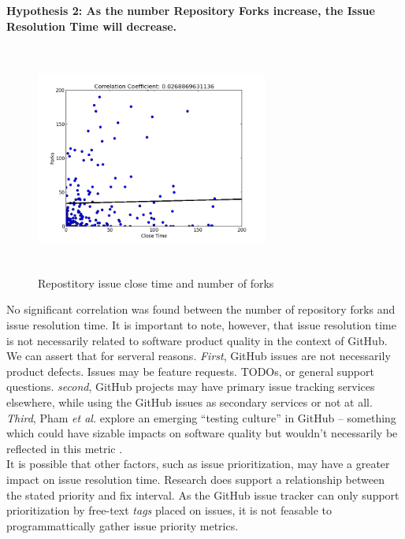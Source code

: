 \documentclass{proc}
\begin{document}
\textbf{Hypothesis 2: As the number Repository Forks increase, the Issue Resolution Time will decrease.}\\
\begin{figure}
\includegraphics[height=3in,width=3in]{images/issue_close_time_forks_scatterplot.png}
\caption{Repostitory issue close time and number of forks}
\label{fig:issue_close_time_forks_scatterplot}
\end{figure}
No significant correlation was found between the number of repository forks and issue resolution time. It is important to note, however, that issue resolution time is not necessarily related to software product quality in the context of GitHub. We can assert that for serveral reasons. \textit{First}, GitHub issues are not necessarily product defects. Issues may be feature requests. TODOs, or general support questions. \textit{second}, GitHub projects may have primary issue tracking services elsewhere, while using the GitHub issues as secondary services or not at all. \textit{Third}, Pham \textit{et al.} explore an emerging ``testing culture'' in GitHub -- something which could have sizable impacts on software quality but wouldn't necessarily be reflected in this metric \cite{phamcreating}.\\

It is possible that other factors, such as issue prioritization, may have a greater impact on issue resolution time. Research does support a relationship\cite{mockus2002two} between the stated priority and fix interval. As the GitHub issue tracker can only support prioritization by free-text \textit{tags} placed on issues, it is not feasable to programmattically gather issue priority metrics.
\end{document}

